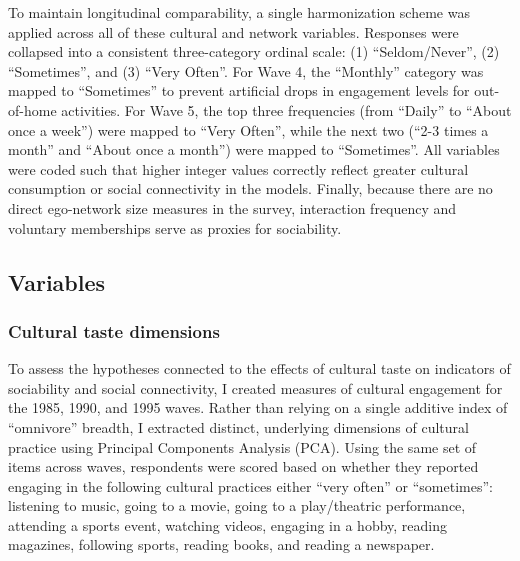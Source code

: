 \documentclass[
]{article}
\begin{document}
To maintain longitudinal comparability, a single harmonization scheme was applied across all of these cultural and network variables. Responses were collapsed into a consistent three-category ordinal scale: (1) ``Seldom/Never'', (2) ``Sometimes'', and (3) ``Very Often''. For Wave 4, the ``Monthly'' category was mapped to ``Sometimes'' to prevent artificial drops in engagement levels for out-of-home activities. For Wave 5, the top three frequencies (from ``Daily'' to ``About once a week'') were mapped to ``Very Often'', while the next two (``2-3 times a month'' and ``About once a month'') were mapped to ``Sometimes''. All variables were coded such that higher integer values correctly reflect greater cultural consumption or social connectivity in the models. Finally, because there are no direct ego-network size measures in the survey, interaction frequency and voluntary memberships serve as proxies for sociability.

\subsection{Variables}\label{variables}

\subsubsection{Cultural taste dimensions}\label{cultural-taste-indicators}

To assess the hypotheses connected to the effects of cultural taste on indicators of sociability and social connectivity, I created measures of cultural engagement for the 1985, 1990, and 1995 waves. Rather than relying on a single additive index of ``omnivore'' breadth, I extracted distinct, underlying dimensions of cultural practice using Principal Components Analysis (PCA). Using the same set of items across waves, respondents were scored based on whether they reported engaging in the following cultural practices either ``very often'' or ``sometimes'': listening to music, going to a movie, going to a play/theatric performance, attending a sports event, watching videos, engaging in a hobby, reading magazines, following sports, reading books, and reading a newspaper.
\end{document}
